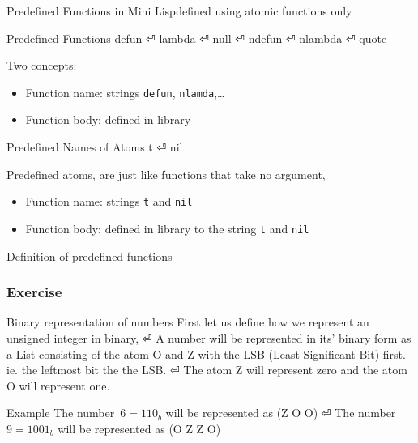 \documentclass[fleqn]{beamer}
\begin{document}
\begin{frame}{Predefined Functions in Mini Lisp}{defined using atomic functions only}
\begin{block}{Predefined Functions}
  defun ⏎
  lambda ⏎
  null ⏎
  ndefun ⏎
  nlambda ⏎
  quote
\end{block}
Two concepts:
\begin{itemize}
  \item Function name: strings \texttt{defun}, \texttt{nlamda},…
  \item Function body: defined in library
\end{itemize}
\pause
\begin{block}{Predefined Names of Atoms}
  t ⏎
  nil
\end{block}

Predefined atoms, are just like functions that take no argument,
\begin{itemize}
  \item Function name: strings \texttt{t} and \texttt{nil}
  \item Function body: defined in library to the string \texttt{t} and \texttt{nil}
\end{itemize}
\end{frame}

\begin{frame}{Definition of predefined functions}
\begin{LTR}
  
\end{LTR}
\end{frame}

\begin{frame}
\frametitle{Exercise}
\begin{block}{Binary representation of numbers}
  First let us define how we represent an unsigned integer in binary, ⏎
  A number will be represented in its' binary form as a List consisting of the atom O and Z with the LSB (Least Significant Bit) first. ie. the leftmost bit the the LSB. ⏎
  The atom Z will represent zero and the atom O will represent one.
\end{block}

\begin{block}{Example}
  The number~$6={110}_b$ will be represented as (Z O O) ⏎
  The number~$9={1001}_b$ will be represented as (O Z Z O)
\end{block}
\end{frame}
\end{document}
